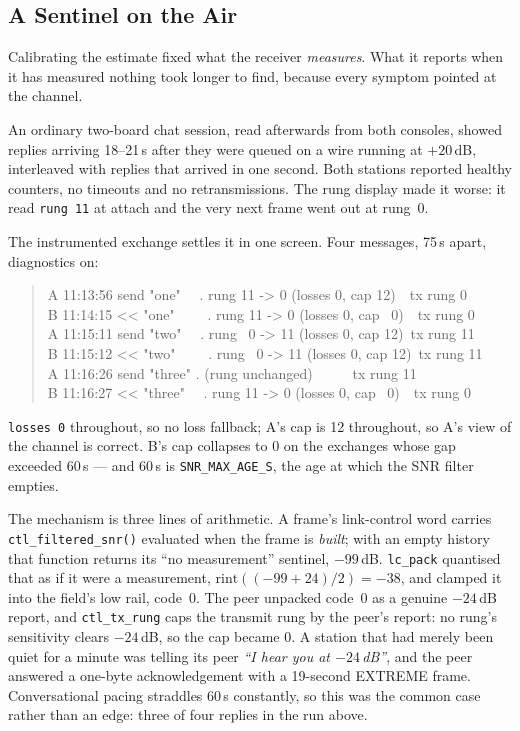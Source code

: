 \subsection{A Sentinel on the Air}
\label{sec:cport_sentinel}

Calibrating the estimate fixed what the receiver \emph{measures}.  What
it reports when it has measured nothing took longer to find, because
every symptom pointed at the channel.

An ordinary two-board chat session, read afterwards from both consoles,
showed replies arriving 18--21\,s after they were queued on a wire
running at $+20$\,dB, interleaved with replies that arrived in one
second.  Both stations reported healthy counters, no timeouts and no
retransmissions.  The rung display made it worse: it read \texttt{rung
11} at attach and the very next frame went out at rung~0.

The instrumented exchange settles it in one screen.  Four messages,
75\,s apart, diagnostics on:

\begin{quote}\ttfamily\small
A 11:13:56 send "one" \ \ . rung 11 -> 0 (losses 0, cap 12)\ \ tx rung 0\\
B 11:14:15 << "one" \ \ \ \ . rung 11 -> 0 (losses 0, cap \ 0)\ \ tx rung 0\\
A 11:15:11 send "two" \ \ . rung \ 0 -> 11 (losses 0, cap 12)\ tx rung 11\\
B 11:15:12 << "two" \ \ \ \ . rung \ 0 -> 11 (losses 0, cap 12)\ tx rung 11\\
A 11:16:26 send "three" . (rung unchanged) \ \ \ \ \ tx rung 11\\
B 11:16:27 << "three" \ \ . rung 11 -> 0 (losses 0, cap \ 0)\ \ tx rung 0
\end{quote}

\texttt{losses 0} throughout, so no loss fallback; A's cap is 12
throughout, so A's view of the channel is correct.  B's cap collapses
to 0 on the exchanges whose gap exceeded 60\,s --- and 60\,s is
\texttt{SNR\_MAX\_AGE\_S}, the age at which the SNR filter empties.

The mechanism is three lines of arithmetic.  A frame's link-control
word carries \texttt{ctl\_filtered\_snr()} evaluated when the frame is
\emph{built}; with an empty history that function returns its
``no measurement'' sentinel, $-99$\,dB.  \texttt{lc\_pack} quantised
that as if it were a measurement, $\mathrm{rint}((-99+24)/2) = -38$,
and clamped it into the field's low rail, code~0.  The peer unpacked
code~0 as a genuine $-24$\,dB report, and \texttt{ctl\_tx\_rung} caps
the transmit rung by the peer's report: no rung's sensitivity clears
$-24$\,dB, so the cap became 0.  A station that had merely been quiet
for a minute was telling its peer \emph{``I hear you at $-24$\,dB''},
and the peer answered a one-byte acknowledgement with a 19-second
EXTREME frame.  Conversational pacing straddles 60\,s constantly, so
this was the common case rather than an edge: three of four replies in
the run above.

